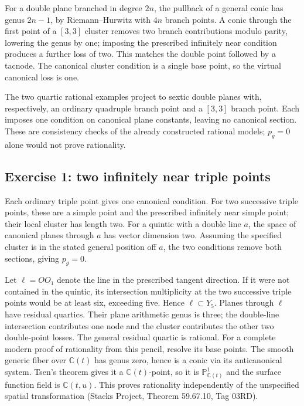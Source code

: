 For a double plane branched in degree \(2n\), the pullback of a general conic has genus \(2n-1\), by Riemann--Hurwitz with \(4n\) branch points. A conic through the first point of a \([3,3]\) cluster removes two branch contributions modulo parity, lowering the genus by one; imposing the prescribed infinitely near condition produces a further loss of two. This matches the double point followed by a tacnode. The canonical cluster condition is a single base point, so the virtual canonical loss is one.

The two quartic rational examples project to sextic double planes with, respectively, an ordinary quadruple branch point and a \([3,3]\) branch point. Each imposes one condition on canonical plane constants, leaving no canonical section. These are consistency checks of the already constructed rational models; \(p_g=0\) alone would not prove rationality.

\subsection{Exercise 1: two infinitely near triple points}

Each ordinary triple point gives one canonical condition. For two successive triple points, these are a simple point and the prescribed infinitely near simple point; their local cluster has length two. For a quintic with a double line \(a\), the space of canonical planes through \(a\) has vector dimension two. Assuming the specified cluster is in the stated general position off \(a\), the two conditions remove both sections, giving \(p_g=0\).

Let \(\ell=OO_1\) denote the line in the prescribed tangent direction. If it were not contained in the quintic, its intersection multiplicity at the two successive triple points would be at least six, exceeding five. Hence \(\ell\subset Y_5\). Planes through \(\ell\) have residual quartics. Their plane arithmetic genus is three; the double-line intersection contributes one node and the cluster contributes the other two double-point losses. The general residual quartic is rational. For a complete modern proof of rationality from this pencil, resolve its base points. The smooth generic fiber over \(\mathbb{C}(t)\) has genus zero, hence is a conic via its anticanonical system. Tsen's theorem gives it a \(\mathbb{C}(t)\)-point, so it is \(\mathbb{P}^1_{\mathbb{C}(t)}\) and the surface function field is \(\mathbb{C}(t,u)\). This proves rationality independently of the unspecified spatial transformation (Stacks Project, Theorem 59.67.10, Tag 03RD).


